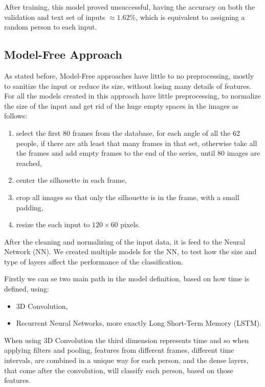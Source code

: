 \documentclass[12pt]{article}
\theoremstyle{definition}
\begin{document}
	After training, this model proved unsuccessful, having the accuracy on both the validation and text set of inputs $\approx 1.62\%$, which is equivalent to assigning a random person to each input.

	\subsection{Model-Free Approach}

	As stated before, Model-Free approaches have little to no preprocessing, mostly to sanitize the input or reduce its size, without losing many details of features. For all the models created in this approach have little preprocessing, to normalize the size of the input and get rid of the huge empty spaces in the images as follows:
	\begin{enumerate}
		\item select the first 80 frames from the database, for each angle of all the 62 people, if there are ath least that many frames in that set, otherwise take all the frames and add empty frames to the end of the series, until 80 images are reached,
		\item center the silhouette in each frame,
		\item crop all images so that only the silhouette is in the frame, with a small padding,
		\item resize the each input to $120 \times 60$ pixels.
	\end{enumerate}

	After the cleaning and normalizing of the input data, it is feed to the Neural Network (NN). We created multiple models for the NN, to test how the size and type of layers affect the performance of the classification.

	Firstly we can se two main path in the model definition, based on how time is defined, using:
	\begin{itemize}
		\item 3D Convolution,
		\item Recurrent Neural Networks, more exactly Long Short-Term Memory (LSTM).
	\end{itemize}

	When using 3D Convolution the third dimension represents time and so when applying filters and pooling, features from different frames, different time intervals, are combined in a unique way for each person, and the dense layers, that come after the convolution, will classify each person, based on those features.
\end{document}
